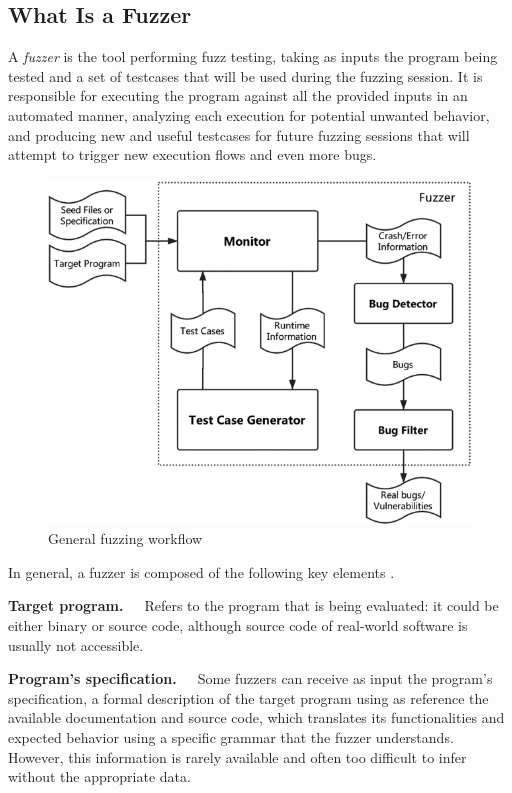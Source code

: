 \subsection{What Is a Fuzzer}  \label{fuzzers}
A \textit{fuzzer} is the tool performing fuzz testing, taking as inputs the program being tested and a set of testcases that will be used during the fuzzing session. It is responsible for executing the program against all the provided inputs in an automated manner, analyzing each execution for potential unwanted behavior, and producing new and useful testcases for future fuzzing sessions that will attempt to trigger new execution flows and even more bugs.
\newline
\begin{figure}[h]
\centering
\includegraphics[scale=0.46]{foto/fuzzing_workflow.png}
\caption{General fuzzing workflow \cite{fuzzing_survey}}
\label{fig:fuzzing_workflow}
\end{figure}

In general, a fuzzer is composed of the following key elements \cite{afl_docs} \cite{fuzzing_survey}.

\textbf{Target program.}\ \ \ Refers to the program that is being evaluated: it could be either binary or source code, although source code of real-world software is usually not accessible.

\textbf{Program's specification.}\ \ \ Some fuzzers can receive as input the program's specification, a formal description of the target program using as reference the available documentation and source code, which translates its functionalities and expected behavior using a specific grammar that the fuzzer understands. However, this information is rarely available and often too difficult to infer without the appropriate data.

